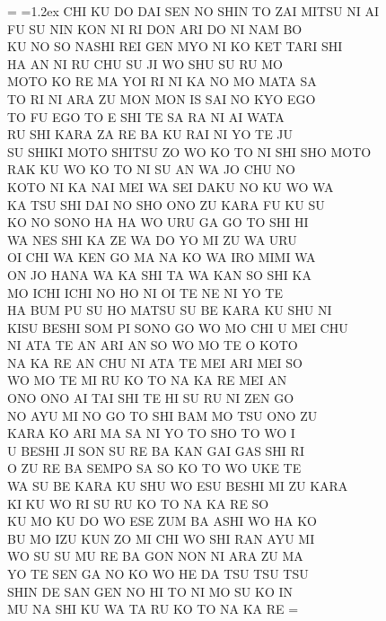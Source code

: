 \documentclass[12pt]{report}
\newcommand{\sbJapanese}[1]{
  \newdimen\origiwspc
  \origiwspc=\fontdimen2\font
  \fontdimen2\font=1.2ex
  {#1}
  \fontdimen2\font=\origiwspc
}
\begin{document}
\sbJapanese{
  CHI KU DO DAI SEN NO SHIN TO ZAI MITSU NI AI\\
  FU SU NIN KON NI RI DON ARI DO NI NAM BO\\
  KU NO SO NASHI REI GEN MYO NI KO KET TARI SHI\\
  HA AN NI RU CHU SU JI WO SHU SU RU MO\\
  MOTO KO RE MA YOI RI NI KA NO MO MATA SA\\
  TO RI NI ARA ZU MON MON IS SAI NO KYO EGO\\
  TO FU EGO TO E SHI TE SA RA NI AI WATA\\
  RU SHI KARA ZA RE BA KU RAI NI YO TE JU\\
  SU SHIKI MOTO SHITSU ZO WO KO TO NI SHI SHO MOTO\\
  RAK KU WO KO TO NI SU AN WA JO CHU NO\\
  KOTO NI KA NAI MEI WA SEI DAKU NO KU WO WA\\
  KA TSU SHI DAI NO SHO ONO ZU KARA FU KU SU\\
  KO NO SONO HA HA WO URU GA GO TO SHI HI\\
  WA NES SHI KA ZE WA DO YO MI ZU WA URU\\
  OI CHI WA KEN GO MA NA KO WA IRO MIMI WA\\
  ON JO HANA WA KA SHI TA WA KAN SO SHI KA\\
  MO ICHI ICHI NO HO NI OI TE NE NI YO TE\\
  HA BUM PU SU HO MATSU SU BE KARA KU SHU NI\\
  KISU BESHI SOM PI SONO GO WO MO CHI U MEI CHU\\
  NI ATA TE AN ARI AN SO WO MO TE O KOTO\\
  NA KA RE AN CHU NI ATA TE MEI ARI MEI SO\\
  WO MO TE MI RU KO TO NA KA RE MEI AN\\
  ONO ONO AI TAI SHI TE HI SU RU NI ZEN GO\\
  NO AYU MI NO GO TO SHI BAM MO TSU ONO ZU\\
  KARA KO ARI MA SA NI YO TO SHO TO WO I\\
  U BESHI JI SON SU RE BA KAN GAI GAS SHI RI\\
  O ZU RE BA SEMPO SA SO KO TO WO UKE TE\\
  WA SU BE KARA KU SHU WO ESU BESHI MI ZU KARA\\
  KI KU WO RI SU RU KO TO NA KA RE SO\\
  KU MO KU DO WO ESE ZUM BA ASHI WO HA KO\\
  BU MO IZU KUN ZO MI CHI WO SHI RAN AYU MI\\
  WO SU SU MU RE BA GON NON NI ARA ZU MA\\
  YO TE SEN GA NO KO WO HE DA TSU TSU TSU\\
  SHIN DE SAN GEN NO HI TO NI MO SU KO IN\\
  MU NA SHI KU WA TA RU KO TO NA KA RE
}
\end{document}
